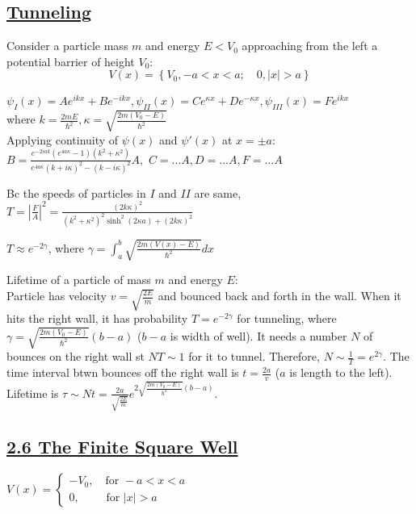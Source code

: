 \subsection{\underline{Tunneling}}
Consider a particle mass $m$ and energy $E < V_0$ approaching from the left a potential barrier of height $V_0$:
$$V(x) = \left\{ V_0, -a < x < a; \quad 0, |x| > a \right\}$$

$\psi_{I}(x) = Ae^{ikx} + Be^{-ikx}, \psi_{II}(x) = Ce^{\kappa x} + De^{-\kappa x}, \psi_{III}(x) = Fe^{ikx}$ \\
where $k = \frac{2mE}{\hbar^2}, \kappa = \sqrt{\frac{2m(V_0 - E)}{\hbar^2}}$ \\

Applying continuity of $\psi(x)$ and $\psi'(x)$ at $x = \pm a$:
    $B = \frac{e^{-2iak}(e^{4a\kappa} - 1)(k^2 + \kappa^2)}{e^{4a\kappa} (k + i\kappa)^2 - (k - i \kappa)^2} A,$
    $C = ...A, D = ... A, F = ...A$

Bc the speeds of particles in $I$ and $II$ are same, $T = |\frac{F}{A}|^2 = \frac{(2 k \kappa)^2}{(k^2 + \kappa^2)^2 \sinh^2(2\kappa a) + (2 k \kappa)^2}$

$T \approx e^{-2 \gamma}$, where $\gamma = \int_{a}^{b} \sqrt{\frac{2m (V(x) - E)}{\hbar^2}} dx$

Lifetime of a particle of mass $m$ and energy $E$: \\
Particle has velocity $v = \sqrt{\frac{2E}{m}}$ and bounced back and forth in the wall. When it hits the right wall, it has probability $T=e^{-2\gamma}$ for tunneling, where $\gamma = \sqrt{\frac{2m(V_0 - E)}{\hbar^2}}(b-a)$ ($b-a$ is width of well). It needs a number $N$ of bounces on the right wall st $NT \sim 1$ for it to tunnel. Therefore, $N \sim \frac{1}{T} = e^{2\gamma}$. The time interval btwn bounces off the right wall is $t = \frac{2a}{v}$ ($a$ is length to the left). Lifetime is $\tau \sim Nt = \frac{2a}{\sqrt{\frac{2E}{m}}} e^{2 \sqrt{\frac{2m(V_0 - E)}{\hbar^2}} (b-a)}$.

\subsection{\underline{2.6 The Finite Square Well}}
$V(x) = 
\begin{cases}
    -V_{0}, \quad \textrm{for } -a < x < a &\\
    0, \qquad \textrm{ for } |x| > a &
\end{cases}$


